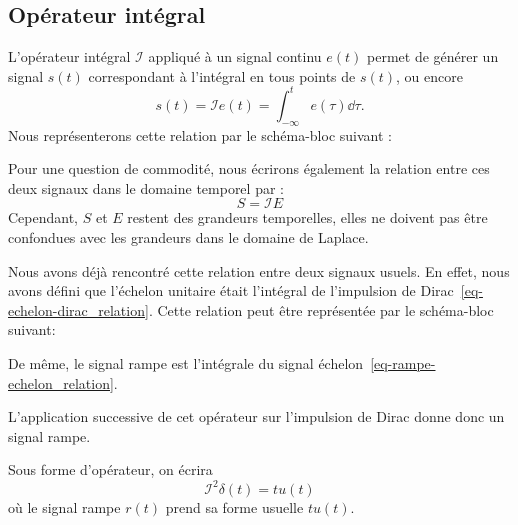 \subsection{Opérateur intégral}
L'opérateur intégral $\mathcal{I}$ appliqué à un signal 
continu $e(t)$ permet de générer un signal $s(t)$ correspondant 
à l'intégral en tous points de $s(t)$, ou encore
\[
    s(t)=\mathcal{I} e(t)=\int_{-\infty}^t e(\tau)\dd{\tau}.
\]
Nous représenterons cette relation par le schéma-bloc suivant :
\begin{center}
    
\end{center}
Pour une question de commodité, nous écrirons également la relation entre ces 
deux signaux dans le domaine temporel par :
\[
    S=\mathcal{I} E
\]
Cependant, $S$ et $E$ restent des grandeurs temporelles, elles ne doivent pas
être confondues avec les grandeurs dans le domaine de Laplace.

Nous avons déjà rencontré cette relation entre deux signaux usuels. En effet, 
nous avons défini que l'échelon unitaire était l'intégral de l'impulsion de 
Dirac~\cref{eq-echelon-dirac_relation}. Cette relation peut être représentée
par le schéma-bloc suivant:
\begin{center}
    
\end{center}
De même, le signal rampe est l'intégrale du signal 
échelon~\cref{eq-rampe-echelon_relation}.
\begin{center}
    
\end{center}
L'application successive de cet opérateur sur l'impulsion de Dirac donne 
donc un signal rampe.
\begin{center}
    
\end{center}
Sous forme d'opérateur, on écrira 
\[
    \mathcal{I}^2\delta(t)=tu(t)
\]
où le signal rampe $r(t)$ prend sa forme usuelle $tu(t)$.

